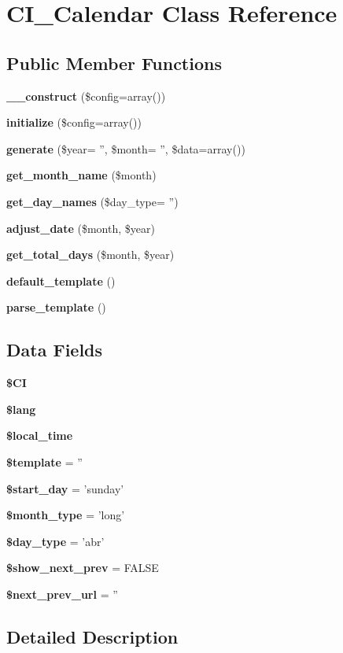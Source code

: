 \section{C\-I\-\_\-\-Calendar Class Reference}
\label{class_c_i___calendar}
\subsection*{Public Member Functions}
\begin{DoxyCompactItemize}
\item 
{\bf \-\_\-\-\_\-construct} (\$config=array())
\item 
{\bf initialize} (\$config=array())
\item 
{\bf generate} (\$year= '', \$month= '', \$data=array())
\item 
{\bf get\-\_\-month\-\_\-name} (\$month)
\item 
{\bf get\-\_\-day\-\_\-names} (\$day\-\_\-type= '')
\item 
{\bf adjust\-\_\-date} (\$month, \$year)
\item 
{\bf get\-\_\-total\-\_\-days} (\$month, \$year)
\item 
{\bf default\-\_\-template} ()
\item 
{\bf parse\-\_\-template} ()
\end{DoxyCompactItemize}
\subsection*{Data Fields}
\begin{DoxyCompactItemize}
\item 
{\bf \$\-C\-I}
\item 
{\bf \$lang}
\item 
{\bf \$local\-\_\-time}
\item 
{\bf \$template} = ''
\item 
{\bf \$start\-\_\-day} = 'sunday'
\item 
{\bf \$month\-\_\-type} = 'long'
\item 
{\bf \$day\-\_\-type} = 'abr'
\item 
{\bf \$show\-\_\-next\-\_\-prev} = F\-A\-L\-S\-E
\item 
{\bf \$next\-\_\-prev\-\_\-url} = ''
\end{DoxyCompactItemize}


\subsection{Detailed Description}


